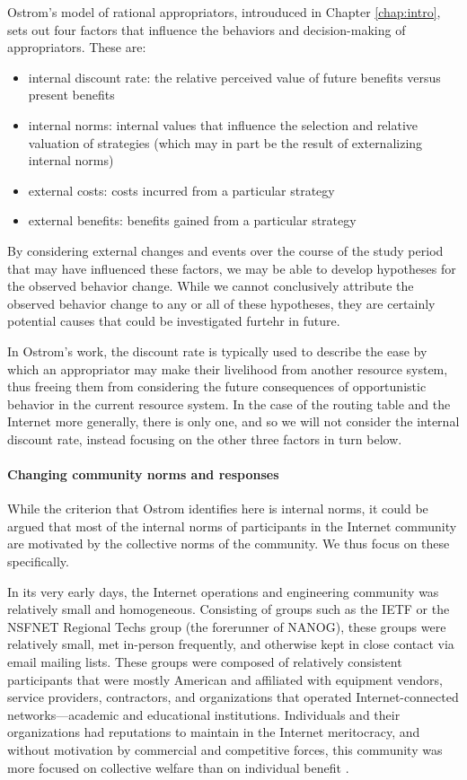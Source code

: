 Ostrom's model of rational appropriators, introuduced in Chapter
\ref{chap:intro}, sets out four factors that influence the behaviors and
decision-making of appropriators. These are:
\begin{itemize}
    \item{internal discount rate: the relative perceived value of future
    benefits versus present benefits}
    \item{internal norms: internal values that influence the selection and
    relative valuation of strategies (which may in part be the result of
    externalizing internal norms)}
    \item{external costs: costs incurred from a particular strategy}
    \item{external benefits: benefits gained from a particular strategy}
\end{itemize}
By considering external changes and events over the course of the study period
that may have influenced these factors, we may be able to develop hypotheses
for the observed behavior change. While we cannot conclusively attribute the
observed behavior change to any or all of these hypotheses, they are certainly
potential causes that could be investigated furtehr in future.

In Ostrom's work, the discount rate is typically used to describe the ease by
which an appropriator may make their livelihood from another resource system,
thus freeing them from considering the future consequences of opportunistic
behavior in the current resource system.  In the case of the routing table and
the Internet more generally, there is only one, and so we will not consider the
internal discount rate, instead focusing on the other three factors in turn
below.

\paragraph{Changing community norms and responses}
While the criterion that Ostrom identifies here is internal norms, it could be
argued that most of the internal norms of participants in the Internet
community are motivated by the collective norms of the community. We thus focus
on these specifically.

In its very early days, the Internet operations and engineering community was
relatively small and homogeneous. Consisting of groups such as the IETF or the
NSFNET Regional Techs group (the forerunner of NANOG), these groups were
relatively small, met in-person frequently, and otherwise kept in close contact
via email mailing lists. These groups were composed of relatively consistent
participants that were mostly American and affiliated with equipment vendors,
service providers, contractors, and organizations that operated
Internet-connected networks---academic and educational institutions.
Individuals and their organizations had reputations to maintain in the Internet
meritocracy, and without motivation by commercial and competitive forces, this
community was more focused on collective welfare than on individual benefit
\cite{Li:2011vn}.

